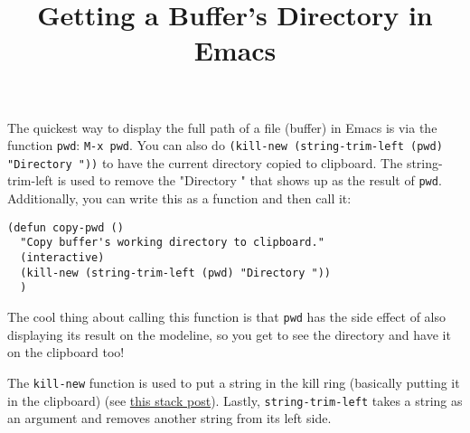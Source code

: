 \documentclass[12pt, a4paper]{article}
\date{}
\title{Getting a Buffer's Directory in Emacs}
\begin{document}
\maketitle
The quickest way to display the full path of a file (buffer) in Emacs is via the function \texttt{pwd}: \texttt{M-x pwd}.
You can also do \texttt{(kill-new (string-trim-left (pwd) "Directory "))} to have the current directory copied to clipboard. The string-trim-left is used to remove the "Directory " that shows up as the result of \texttt{pwd}.
Additionally, you can write this as a function and then call it:
\lstset{language=elisp,label= ,caption= ,captionpos=b,numbers=none}
\begin{lstlisting}
(defun copy-pwd ()
  "Copy buffer's working directory to clipboard."
  (interactive)
  (kill-new (string-trim-left (pwd) "Directory "))
  )
\end{lstlisting}
The cool thing about calling this function is that \texttt{pwd} has the side effect of also displaying its result on the modeline, so you get to see the directory and have it on the clipboard too!

The \texttt{kill-new} function is used to put a string in the kill ring (basically putting it in the clipboard) (see \href{https://stackoverflow.com/questions/2178850/how-to-copy-to-clipboard-in-emacs-lisp}{this stack post}). Lastly, \texttt{string-trim-left} takes a string as an argument and removes another string from its left side.
\end{document}
